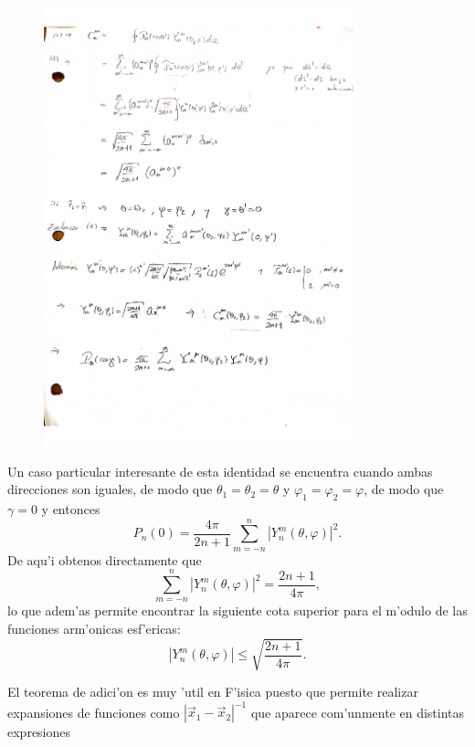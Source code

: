 \begin{figure}[H]
\centering
\includegraphics[angle=0,width=0.8\textwidth]{figs/FM2-01_11.pdf}
\end{figure}

Un caso particular interesante de esta identidad se encuentra cuando ambas direcciones son iguales, de modo que  $\theta_1=\theta_2=\theta$ y $\varphi_1=\varphi_2=\varphi$, de modo que $\gamma=0$ y entonces
\begin{equation}
P_n(0) = \frac{4\pi}{2n+1} \sum_{m=-n}^n \left|Y_n^m(\theta,\varphi)\right|^2.
\end{equation}
De aqu'i obtenos directamente que
\begin{equation}
\sum_{m=-n}^n \left|Y_n^m(\theta,\varphi)\right|^2 = \frac{2n+1}{4\pi},
\end{equation}
lo que adem'as permite encontrar la siguiente cota superior para el m'odulo de las funciones arm'onicas esf'ericas:
\begin{equation}
\left|Y_n^m(\theta,\varphi)\right| \le \sqrt{\frac{2n+1}{4\pi}}.
\end{equation}

El teorema de adici'on es muy 'util en F'isica puesto que permite realizar expansiones de funciones como $\left|\vec{x}_1-\vec{x}_2\right|^{-1}$ que aparece com'unmente en distintas expresiones

